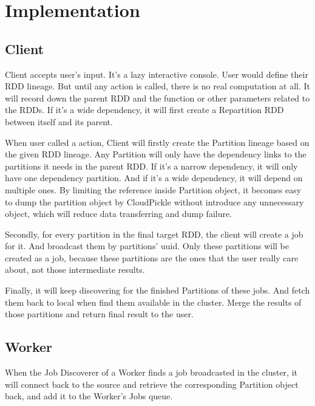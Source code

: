 
\section{Implementation} %
\label{sec:implementation}

\subsection{Client} %
\label{sub:client}
Client accepts user's input. It's a lazy interactive console.
User would define their RDD lineage. But until any action is called, there is no real computation at all.
It will record down the parent RDD and the function or other parameters related to the RDDs\@.
If it's a wide dependency, it will first create a Repartition RDD between itself and its parent.

When user called a action, Client will firstly create the Partition lineage based on the given RDD lineage.
Any Partition will only have the dependency links to the partitions it needs in the parent RDD\@.
If it's a narrow dependency, it will only have one dependency partition.
And if it's a wide dependency, it will depend on multiple ones.
By limiting the reference inside Partition object,
it becomes easy to dump the partition object by CloudPickle\cite{cloudpickle} without introduce any unnecessary object,
which will reduce data transferring and dump failure.

Secondly, for every partition in the final target RDD, the client will create a job for it.
And broadcast them by partitions' uuid.
Only these partitions will be created as a job,
because these partitions are the ones that the user really care about, not those intermediate results.

Finally, it will keep discovering for the finished Partitions of these jobs.
And fetch them back to local when find them available in the cluster.
Merge the results of those partitions and return final result to the user.

\subsection{Worker} %
\label{sub:worker}
When the Job Discoverer of a Worker finds a job broadcasted in the cluster,
it will connect back to the source and retrieve the corresponding Partition object back,
and add it to the Worker's Jobs queue.

